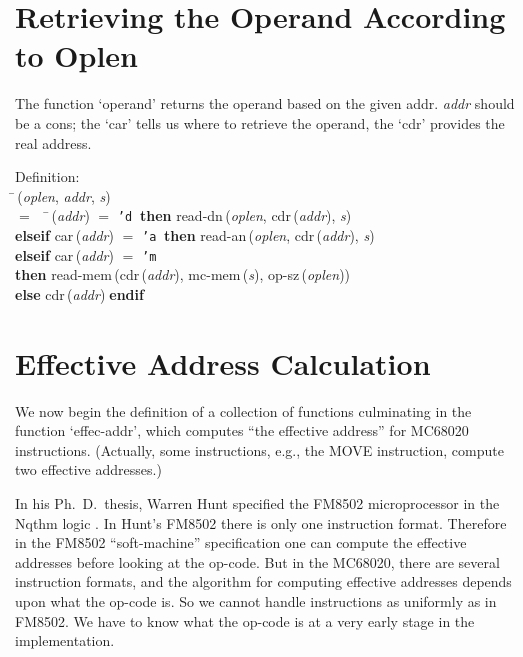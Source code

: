  \section{Retrieving the Operand According to Oplen}

 The function `operand' returns the operand based on the given addr.
 {\it{addr\/}} should be a cons; the `car' tells us where to retrieve the operand,
 the `cdr' provides the real address.
\begin{tabbing}{\sc Definition}: \\  
\=\,({\it{oplen\/}}, {\it{addr\/}}, {\it{s\/}}) \\ 
$=$$\;\;\;\;$\=\,({\it{addr\/}}) $=$ {\tt{'}}{\tt{d}}$\;\;${\bf then }{\rm{read-dn}}\,({\it{oplen\/}}, {\rm{cdr}}\,({\it{addr\/}}), {\it{s\/}}) \\ 
{\bf elseif }{\rm{car}}\,({\it{addr\/}}) $=$ {\tt{'}}{\tt{a}}$\;\;${\bf then }{\rm{read-an}}\,({\it{oplen\/}}, {\rm{cdr}}\,({\it{addr\/}}), {\it{s\/}}) \\ 
{\bf elseif }{\rm{car}}\,({\it{addr\/}}) $=$ {\tt{'}}{\tt{m}} \\ 
{\bf then }{\rm{read-mem}}\,({\rm{cdr}}\,({\it{addr\/}}), {\rm{mc-mem}}\,({\it{s\/}}), {\rm{op-sz}}\,({\it{oplen\/}})) \\ 
{\bf else }{\rm{cdr}}\,({\it{addr\/}})$\;${\bf  endif}\-\-
\end{tabbing}

 \section{Effective Address Calculation}

 We now begin the definition of a collection of functions culminating
 in the function `effec-addr', which computes ``the effective
 address'' for MC68020 instructions.  (Actually, some instructions,
 e.g., the MOVE instruction, compute two effective addresses.)

 In his Ph.~D.\ thesis, Warren Hunt specified the FM8502 microprocessor in
 the Nqthm logic \cite{m:stack}.  In Hunt's FM8502 there is only one instruction
 format.  Therefore in the FM8502 ``soft-machine'' specification one
 can compute the effective addresses before looking at the op-code.
 But in the MC68020, there are several instruction formats, and the
 algorithm for computing effective addresses depends upon what the
 op-code is.  So we cannot handle instructions as uniformly as in
 FM8502.  We have to know what the op-code is at a very early stage
 in the implementation.

